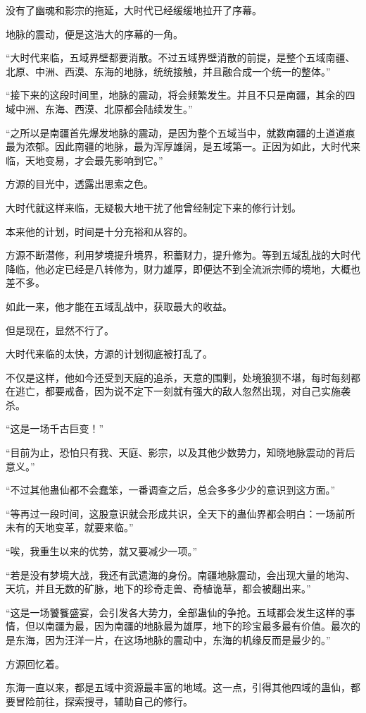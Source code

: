 \begin{this_body}
没有了幽魂和影宗的拖延，大时代已经缓缓地拉开了序幕。

地脉的震动，便是这浩大的序幕的一角。

“大时代来临，五域界壁都要消散。不过五域界壁消散的前提，是整个五域南疆、北原、中洲、西漠、东海的地脉，统统接触，并且融合成一个统一的整体。”

“接下来的这段时间里，地脉的震动，将会频繁发生。并且不只是南疆，其余的四域中洲、东海、西漠、北原都会陆续发生。”

“之所以是南疆首先爆发地脉的震动，是因为整个五域当中，就数南疆的土道道痕最为浓郁。因此南疆的地脉，最为浑厚雄阔，是五域第一。正因为如此，大时代来临，天地变易，才会最先影响到它。”

方源的目光中，透露出思索之色。

大时代就这样来临，无疑极大地干扰了他曾经制定下来的修行计划。

本来他的计划，时间是十分充裕和从容的。

方源不断潜修，利用梦境提升境界，积蓄财力，提升修为。等到五域乱战的大时代降临，他必定已经是八转修为，财力雄厚，即便达不到全流派宗师的境地，大概也差不多。

如此一来，他才能在五域乱战中，获取最大的收益。

但是现在，显然不行了。

大时代来临的太快，方源的计划彻底被打乱了。

不仅是这样，他如今还受到天庭的追杀，天意的围剿，处境狼狈不堪，每时每刻都在逃亡，都要戒备，因为说不定下一刻就有强大的敌人忽然出现，对自己实施袭杀。

“这是一场千古巨变！”

“目前为止，恐怕只有我、天庭、影宗，以及其他少数势力，知晓地脉震动的背后意义。”

“不过其他蛊仙都不会蠢笨，一番调查之后，总会多多少少的意识到这方面。”

“等再过一段时间，这股意识就会形成共识，全天下的蛊仙界都会明白：一场前所未有的天地变革，就要来临。”

“唉，我重生以来的优势，就又要减少一项。”

“若是没有梦境大战，我还有武遗海的身份。南疆地脉震动，会出现大量的地沟、天坑，并且无数的矿脉，地下的珍奇走兽、奇植诡草，都会被翻出来。”

“这是一场饕餮盛宴，会引发各大势力，全部蛊仙的争抢。五域都会发生这样的事情，但以南疆为最，因为南疆的地脉最为雄厚，地下的珍宝最多最有价值。最次的是东海，因为汪洋一片，在这场地脉的震动中，东海的机缘反而是最少的。”

方源回忆着。

东海一直以来，都是五域中资源最丰富的地域。这一点，引得其他四域的蛊仙，都要冒险前往，探索搜寻，辅助自己的修行。


\end{this_body}
